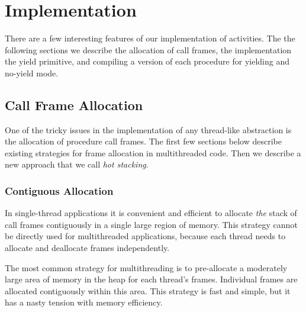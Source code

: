 \documentclass[9pt,preprint]{sigplanconf}
\begin{document}

\section{Implementation}

There are a few interesting features of our implementation of activities.
The the following sections we describe the allocation of call frames, the implementation the yield primitive, and compiling a version of each procedure for yielding and no-yield mode.

\subsection{Call Frame Allocation}

One of the tricky issues in the implementation of any thread-like abstraction is the allocation of procedure call frames.
The first few sections below describe existing strategies for frame allocation in multithreaded code.
Then we describe a new approach that we call \emph{hot stacking}.

\subsubsection{Contiguous Allocation}

In single-thread applications it is convenient and efficient to allocate \emph{the} stack of call frames contiguously in a single large region of memory.
This strategy cannot be directly used for multithreaded applications, because each thread needs to allocate and deallocate frames independently.

The most common strategy for multithreading is to pre-allocate a moderately large area of memory in the heap for each thread's frames.
Individual frames are allocated contiguously within this area.
This strategy is fast and simple, but it has a nasty tension with memory efficiency.
\end{document}
